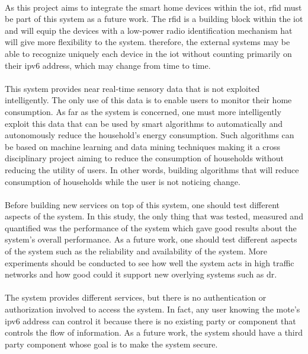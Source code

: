 \documentclass[oneside,12pt,a4paper,final]{book}
\begin{document}
\paragraph{}
As this project aims to integrate the smart home devices within the \gls{iot}, \gls{rfid} must be part of this system as a future work. The \gls{rfid} is a building block within the \gls{iot} and will equip the devices with a low-power radio identification mechanism hat will give more flexibility to the system. therefore, the external systems may be able to recognize uniquely each device in the \gls{iot} without counting primarily on their \gls{ipv6} address, which may change from time to time.
\paragraph{}
This system provides near real-time sensory data that is not exploited intelligently. The only use of this data is to enable users to monitor their home consumption. As far as the system is concerned, one must more intelligently exploit this data that can be used by smart algorithms to automatically and autonomously reduce the household's energy consumption. Such algorithms can be based on machine learning and data mining techniques making it a cross disciplinary project aiming to reduce the consumption of households without reducing the utility of users. In other words, building algorithms that will reduce consumption of households while the user is not noticing change.
\paragraph{}
Before building new services on top of this system, one should test different aspects of the system. In this study, the only thing that was tested, measured and quantified was the performance of the system which gave good results about the system's overall performance. As a future work, one should test different aspects of the system such as the reliability and availability of the system. More experiments should be conducted to see how well the system acts in high traffic networks and how good could it support new overlying systems such as \gls{dr}.
\paragraph{}
The system provides different services, but there is no authentication or authorization involved to access the system. In fact, any user knowing the mote's \gls{ipv6} address can control it because there is no existing party or component that controls the flow of information. As a future work, the system should have a third party component whose goal is to make the system secure.
\end{document}
